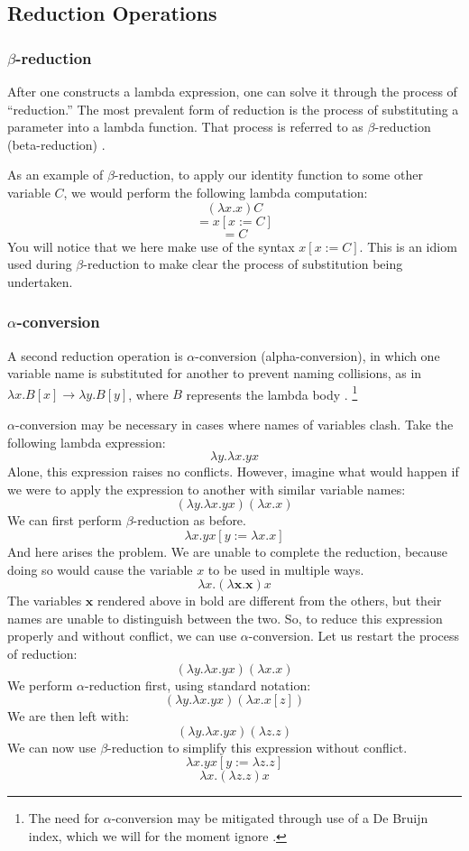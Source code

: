 \documentclass[twocolumn,titlepage,12pt]{article}
\begin{document}
\subsection{Reduction Operations}
\subsubsection{$\beta$-reduction}
After one constructs a lambda expression, one can solve it through the process of ``reduction.'' The most prevalent form of reduction is the process of substituting a parameter into a lambda function. That process is referred to as $\beta$-reduction (beta-reduction) \cite{hudakintro}.

As an example of $\beta$-reduction, to apply our identity function to some other variable $C$, we would perform the following lambda computation:
$$(\lambda x.x)C$$
$$=x[x:=C]$$
$$=C$$
You will notice that we here make use of the syntax $x[x:=C]$. This is an idiom used during $\beta$-reduction to make clear the process of substitution being undertaken.

\subsubsection{$\alpha$-conversion}
A second reduction operation is $\alpha$-conversion (alpha-conversion), in which one variable name is substituted for another to prevent naming collisions, as in $\lambda x.B[x] \to \lambda y.B[y]$, where $B$ represents the lambda body \cite{hudakintro}. \footnote{The need for $\alpha$-conversion may be mitigated through use of a De Bruijn index, which we will for the moment ignore \cite{debruijn}.}

$\alpha$-conversion may be necessary in cases where names of variables clash. Take the following lambda expression:
$$\lambda y.\lambda x.yx$$
Alone, this expression raises no conflicts. However, imagine what would happen if we were to apply the expression to another with similar variable names:
$$(\lambda y.\lambda x.yx)(\lambda x.x)$$
We can first perform $\beta$-reduction as before.
$$\lambda x.yx[y:=\lambda x.x]$$
And here arises the problem. We are unable to complete the reduction, because doing so would cause the variable $x$ to be used in multiple ways.
$$\lambda x.(\lambda \textbf{x}.\textbf{x})x$$
The variables $\textbf{x}$ rendered above in bold are different from the others, but their names are unable to distinguish between the two. So, to reduce this expression properly and without conflict, we can use $\alpha$-conversion. Let us restart the process of reduction:
$$(\lambda y.\lambda x.yx)(\lambda x.x)$$
We perform $\alpha$-reduction first, using standard notation:
$$(\lambda y.\lambda x.yx)(\lambda x.x[z])$$
We are then left with:
$$(\lambda y.\lambda x.yx)(\lambda z.z)$$
We can now use $\beta$-reduction to simplify this expression without conflict.
$$\lambda x.yx[y:=\lambda z.z]$$
$$\lambda x.(\lambda z.z)x$$
\end{document}
